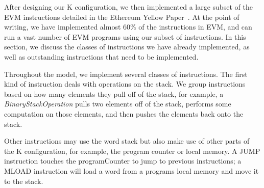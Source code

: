 After designing our K configuration, we then implemented a large subset of the
EVM instructions detailed in the Ethereum Yellow Paper~\cite{gavwood}. At the
point of writing, we have implemented almost 60\% of the instructions in EVM,
and can run a vast number of EVM programs using our subset of instructions. In
this section, we discuss the classes of instructions we have already implemented, as
well as outstanding instructions that need to be implemented.

Throughout the model, we implement several classes of instructions. The first
kind of instruction deals with operations on the stack. We group instructions
based on how many elements they pull off of the stack, for example, a
\textit{BinaryStackOperation} pulls two elements off of the stack, performs some
computation on those elements, and then pushes the elements back onto the stack.

Other instructions may use the word stack but also make use of other parts of
the K configuration, for example, the program counter or local memory. A JUMP
instruction touches the programCounter to jump to previous instructions; a MLOAD
instruction will load a word from a program\textquotesingle s local memory and move it to the
stack.

